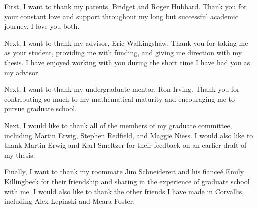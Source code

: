 \noindent
First, I want to thank my parents, Bridget and Roger Hubbard.
Thank you for your constant love and support throughout my long but successful academic journey.
I love you both.

Next, I want to thank my advisor, Eric Walkingshaw.
Thank you for taking me as your student, providing me with funding, and giving me direction with my thesis.
I have enjoyed working with you during the short time I have had you as my advisor.

Next, I want to thank my undergraduate mentor, Ron Irving.
Thank you for contributing so much to my mathematical maturity and encouraging me to pursue graduate school.

Next, I would like to thank all of the members of my graduate committee, including Martin Erwig, Stephen Redfield, and Maggie Niess.
I would also like to thank Martin Erwig and Karl Smeltzer for their feedback on an earlier draft of my thesis.

Finally, I want to thank my roommate Jim Schneidereit and his fiance\'{e} Emily Killingbeck for their friendship and sharing in the experience of graduate school with me.
I would also like to thank the other friends I have made in Corvallis, including Alex Lepinski and Meara Foster.
